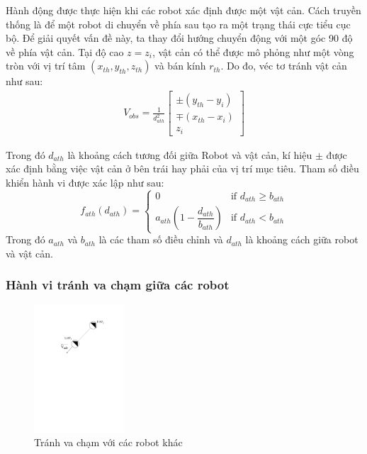 Hành động được thực hiện khi các robot xác định được một vật cản. Cách truyền thống là để một robot di chuyển về phía sau tạo ra một trạng thái cực tiểu cục bộ. Để giải quyết vấn đề này, ta thay đổi hướng chuyển động với một góc 90 độ về phía vật cản. Tại độ cao $z=z_i$, vật cản có thể được mô phỏng như một vòng tròn với vị trí tâm $\left(x_{th},y_{th},z_{th}\right)$ và bán kính $r_{th}$. Do đo, véc tơ tránh vật cản như sau:
\begin{equation}
    \begin{aligned}
        V_{obs}=\frac{1}{d_{ath}^2}
        \left[\begin{array}{c}
        \pm(y_{th}-y_{i})\\
        \mp(x_{th}-x_{i})\\
        z_i
        \end{array}\right]
    \end{aligned}
    \label{eqn:vobs}
\end{equation}

Trong đó $d_{ath}$ là khoảng cách tương đối giữa Robot và vật cản, kí hiệu $\pm$ được xác định bằng việc vật cản ở bên trái hay phải của vị trí mục tiêu. Tham số điều khiển hành vi được xác lập như sau:
\begin{equation}            
    f_{ath}\left(d_{ath}\right)=\left\{ \begin{array}{cc}
    0 & \text{if } d_{ath}\geq b_{ath}\\
    a_{ath}\left(1-\dfrac{d_{ath}}{b_{ath}}\right) & \text{if } d_{ath}<b_{ath}
    \end{array}\right.
\end{equation}
Trong đó $a_{ath}$ và $b_{ath}$ là các tham số điều chỉnh và $d_{ath}$ là khoảng cách giữa robot và vật cản.

\subsubsection{Hành vi tránh va chạm giữa các robot}
\begin{figure}[h]
    \centering
    \includegraphics[width = 0.3\textwidth]{chapter3/image/Behavior_AvoidRobot_cropped.pdf}
    \caption{Tránh va chạm với các robot khác}
    \label{fig:adr}
\end{figure}

